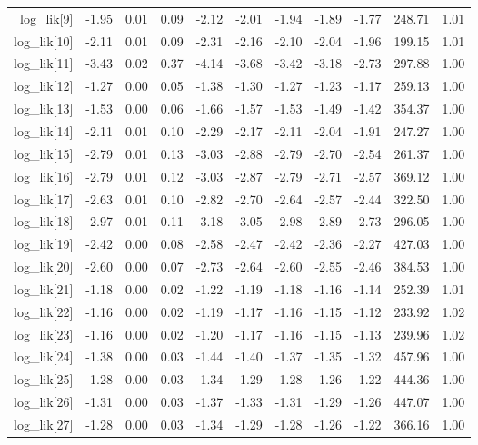 \begin{table}[ht]
\begin{tabular}{rrrrrrrrrrr}
  log\_lik[9] & -1.95 & 0.01 & 0.09 & -2.12 & -2.01 & -1.94 & -1.89 & -1.77 & 248.71 & 1.01 \\ 
  log\_lik[10] & -2.11 & 0.01 & 0.09 & -2.31 & -2.16 & -2.10 & -2.04 & -1.96 & 199.15 & 1.01 \\ 
  log\_lik[11] & -3.43 & 0.02 & 0.37 & -4.14 & -3.68 & -3.42 & -3.18 & -2.73 & 297.88 & 1.00 \\ 
  log\_lik[12] & -1.27 & 0.00 & 0.05 & -1.38 & -1.30 & -1.27 & -1.23 & -1.17 & 259.13 & 1.00 \\ 
  log\_lik[13] & -1.53 & 0.00 & 0.06 & -1.66 & -1.57 & -1.53 & -1.49 & -1.42 & 354.37 & 1.00 \\ 
  log\_lik[14] & -2.11 & 0.01 & 0.10 & -2.29 & -2.17 & -2.11 & -2.04 & -1.91 & 247.27 & 1.00 \\ 
  log\_lik[15] & -2.79 & 0.01 & 0.13 & -3.03 & -2.88 & -2.79 & -2.70 & -2.54 & 261.37 & 1.00 \\ 
  log\_lik[16] & -2.79 & 0.01 & 0.12 & -3.03 & -2.87 & -2.79 & -2.71 & -2.57 & 369.12 & 1.00 \\ 
  log\_lik[17] & -2.63 & 0.01 & 0.10 & -2.82 & -2.70 & -2.64 & -2.57 & -2.44 & 322.50 & 1.00 \\ 
  log\_lik[18] & -2.97 & 0.01 & 0.11 & -3.18 & -3.05 & -2.98 & -2.89 & -2.73 & 296.05 & 1.00 \\ 
  log\_lik[19] & -2.42 & 0.00 & 0.08 & -2.58 & -2.47 & -2.42 & -2.36 & -2.27 & 427.03 & 1.00 \\ 
  log\_lik[20] & -2.60 & 0.00 & 0.07 & -2.73 & -2.64 & -2.60 & -2.55 & -2.46 & 384.53 & 1.00 \\ 
  log\_lik[21] & -1.18 & 0.00 & 0.02 & -1.22 & -1.19 & -1.18 & -1.16 & -1.14 & 252.39 & 1.01 \\ 
  log\_lik[22] & -1.16 & 0.00 & 0.02 & -1.19 & -1.17 & -1.16 & -1.15 & -1.12 & 233.92 & 1.02 \\ 
  log\_lik[23] & -1.16 & 0.00 & 0.02 & -1.20 & -1.17 & -1.16 & -1.15 & -1.13 & 239.96 & 1.02 \\ 
  log\_lik[24] & -1.38 & 0.00 & 0.03 & -1.44 & -1.40 & -1.37 & -1.35 & -1.32 & 457.96 & 1.00 \\ 
  log\_lik[25] & -1.28 & 0.00 & 0.03 & -1.34 & -1.29 & -1.28 & -1.26 & -1.22 & 444.36 & 1.00 \\ 
  log\_lik[26] & -1.31 & 0.00 & 0.03 & -1.37 & -1.33 & -1.31 & -1.29 & -1.26 & 447.07 & 1.00 \\ 
  log\_lik[27] & -1.28 & 0.00 & 0.03 & -1.34 & -1.29 & -1.28 & -1.26 & -1.22 & 366.16 & 1.00 \\ 

\end{tabular}
\end{table}
